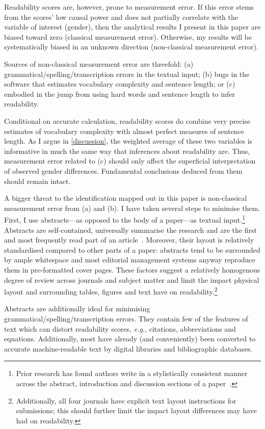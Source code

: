 Readability scores are, however, prone to measurement error. If this error stems from the scores' low causal power and does not partially correlate with the variable of interest (gender), then the analytical results I present in this paper are biased toward zero (classical measurement error). Otherwise, my results will be systematically biased in an unknown direction (non-classical measurement error).

Sources of non-classical measurement error are threefold: (a) grammatical\slash spelling\slash transcription errors in the textual input; (b) bugs in the software that estimates vocabulary complexity and sentence length; or (c) embodied in the jump from using hard words and sentence length to infer readability.

Conditional on accurate calculation, readability scores do combine very precise estimates of vocabulary complexity with almost perfect measures of sentence length. As I argue in \autoref{discussion}, the weighted average of these two variables is informative in much the same way that inferences about readability are. Thus, measurement error related to (c) should only affect the superficial interpretation of observed gender differences. Fundamental conclusions deduced from them should remain intact.

A bigger threat to the identification mapped out in this paper is non-classical measurement error from (a) and (b). I have taken several steps to minimise them. First, I use abstracts---as opposed to the body of a paper---as textual input.\footnote{Prior research has found authors write in a stylistically consistent manner across the abstract, introduction and discussion sections of a paper~\citep{Hartley2003b, Plaven-Sigray2017}.} Abstracts are self-contained, universally summarise the research and are the first and most frequently read part of an article~\citep{King2006}. Moreover, their layout is relatively standardised compared to other parts of a paper: abstracts tend to be surrounded by ample whitespace and most editorial management systems anyway reproduce them in pre-formatted cover pages. These factors suggest a relatively homogenous degree of review across journals and subject matter and limit the impact physical layout and surrounding tables, figures and text have on readability.\footnote{Additionally, all four journals have explicit text layout instructions for submissions; this should further limit the impact layout differences may have had on readability.}

Abstracts are additionally ideal for minimising grammatical\slash spelling\slash transcription errors. They contain few of the features of text which can distort readability scores, \emph{e.g.}, citations, abbreviations and equations. Additionally, most have already (and conveniently) been converted to accurate machine-readable text by digital libraries and bibliographic databases.

